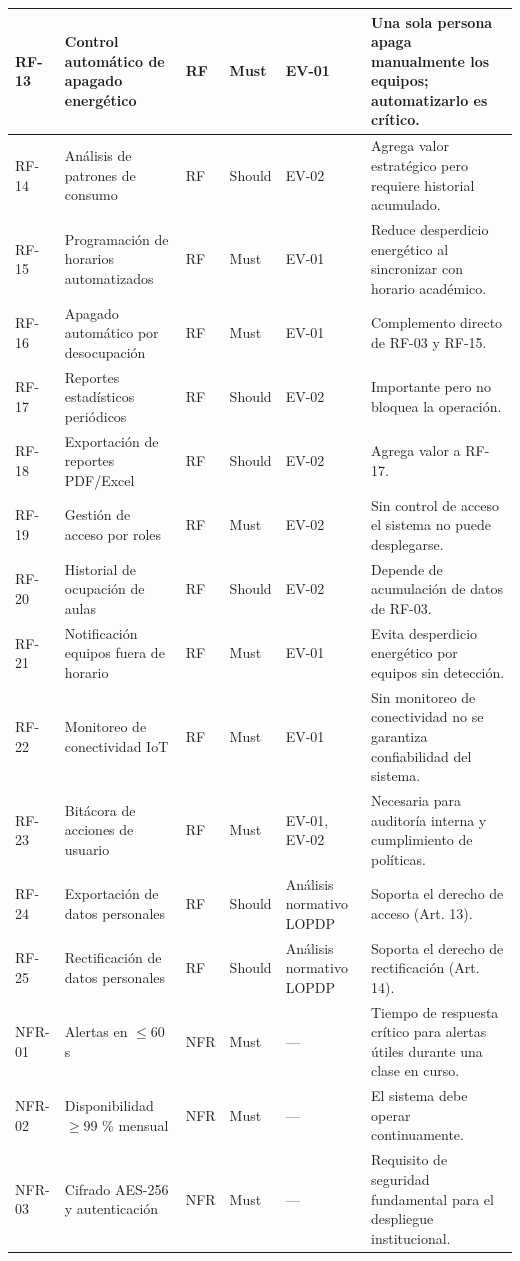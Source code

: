 \begin{longtable}{|p{2.6cm}|p{2.6cm}|p{2.6cm}|p{2.6cm}|p{2.6cm}|p{2.6cm}|}
RF-13 & Control automático de apagado energético & RF & Must & EV-01 & Una sola persona apaga manualmente los equipos; automatizarlo es crítico. \\ \hline
RF-14 & Análisis de patrones de consumo & RF & Should & EV-02 & Agrega valor estratégico pero requiere historial acumulado. \\ \hline
RF-15 & Programación de horarios automatizados & RF & Must & EV-01 & Reduce desperdicio energético al sincronizar con horario académico. \\ \hline
RF-16 & Apagado automático por desocupación & RF & Must & EV-01 & Complemento directo de RF-03 y RF-15. \\ \hline
RF-17 & Reportes estadísticos periódicos & RF & Should & EV-02 & Importante pero no bloquea la operación. \\ \hline
RF-18 & Exportación de reportes PDF/Excel & RF & Should & EV-02 & Agrega valor a RF-17. \\ \hline
RF-19 & Gestión de acceso por roles & RF & Must & EV-02 & Sin control de acceso el sistema no puede desplegarse. \\ \hline
RF-20 & Historial de ocupación de aulas & RF & Should & EV-02 & Depende de acumulación de datos de RF-03. \\ \hline
RF-21 & Notificación equipos fuera de horario & RF & Must & EV-01 & Evita desperdicio energético por equipos sin detección. \\ \hline
RF-22 & Monitoreo de conectividad IoT & RF & Must & EV-01 & Sin monitoreo de conectividad no se garantiza confiabilidad del sistema. \\ \hline
RF-23 & Bitácora de acciones de usuario & RF & Must & EV-01, EV-02 & Necesaria para auditoría interna y cumplimiento de políticas. \\ \hline
RF-24 & Exportación de datos personales & RF & Should & Análisis normativo LOPDP & Soporta el derecho de acceso (Art. 13). \\ \hline
RF-25 & Rectificación de datos personales & RF & Should & Análisis normativo LOPDP & Soporta el derecho de rectificación (Art. 14). \\ \hline
NFR-01 & Alertas en $\leq$60 s & NFR & Must & --- & Tiempo de respuesta crítico para alertas útiles durante una clase en curso. \\ \hline
NFR-02 & Disponibilidad $\geq$99 \% mensual & NFR & Must & --- & El sistema debe operar continuamente. \\ \hline
NFR-03 & Cifrado AES-256 y autenticación & NFR & Must & --- & Requisito de seguridad fundamental para el despliegue institucional. \\ \hline

\end{longtable}
